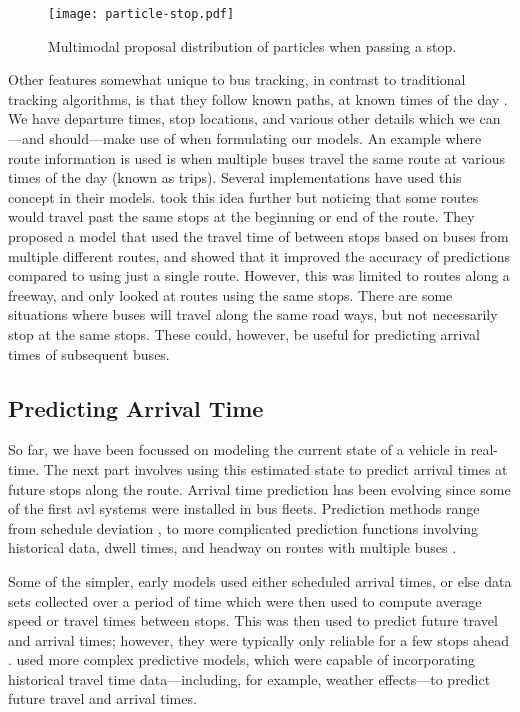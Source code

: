\documentclass[12pt,a4paper]{article}
\begin{document}
\begin{figure}[bt]
  \centering
  \texttt{[image: particle-stop.pdf]}
  \caption{Multimodal proposal distribution of particles when passing a stop.}
  \label{fig:particle-stop}
\end{figure}

Other features somewhat unique to bus tracking, 
in contrast to traditional tracking algorithms,
is that they follow known paths, at known times of the day \citep{cathey-dailey:2003}.
We have departure times, stop locations, 
and various other details which we can---and should---make use of 
when formulating our models.
An example where route information is used is when multiple buses travel the same 
route at various times of the day (known as trips).
Several implementations have used this concept in their models.
\cite{yu-etal:2011} took this idea further but noticing that some routes would 
travel past the same stops at the beginning or end of the route.
They proposed a model that used the travel time of between stops based on buses 
from multiple different routes, and showed that it improved the accuracy of 
predictions compared to using just a single route.
However, this was limited to routes along a freeway,
and only looked at routes using the same stops.
There are some situations where buses will travel along the same road ways, 
but not necessarily stop at the same stops.
These could, however, be useful for predicting arrival times of subsequent buses.



\subsection{Predicting Arrival Time}
\label{sec:arrivaltimeprediction}

So far, we have been focussed on modeling the current state of a vehicle in real-time.
The next part involves using this estimated state to predict arrival times 
at future stops along the route.
Arrival time prediction has been evolving since some of the first \gls{avl}
systems were installed in bus fleets.
Prediction methods range from schedule deviation \citep{cn},
to more complicated prediction functions involving historical data,
dwell times, and headway on routes with multiple buses 
\citep{cn}.


Some of the simpler, early models used either scheduled arrival times, 
or else data sets collected over a period of time which were then used to 
compute average speed or travel times between stops.
This was then used to predict future travel and arrival times;
however, they were typically only reliable for a few stops ahead \citep{cn}.
\cite{cathey-dailey:2003} used more complex predictive models, 
which were capable of incorporating historical travel time
data---including, for example, weather effects---to predict 
future travel and arrival times.
\end{document}
